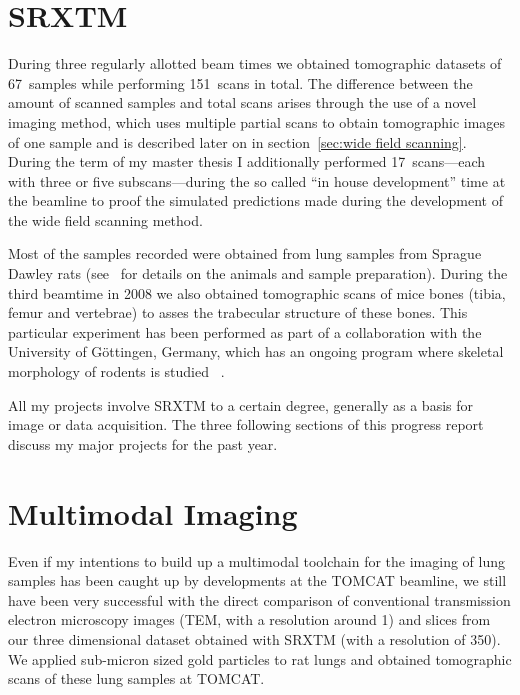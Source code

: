 \documentclass[]{scrartcl}
\begin{document}
\section{SRXTM}
During three regularly allotted beam times we obtained tomographic datasets of 67~samples while performing 151~scans in total. The difference between the amount of scanned samples and total scans arises through the use of a novel imaging method, which uses multiple partial scans to obtain tomographic images of one sample and is described later on in section~\ref{sec:wide field scanning}. During the term of my master thesis I additionally performed 17~scans---each with three or five subscans---during the so called ``in house development'' time at the beamline to proof the simulated predictions made during the development of the wide field scanning method.

Most of the samples recorded were obtained from lung samples from Sprague Dawley rats (see~\cite{Schittny2008} for details on the animals and sample preparation). During the third beamtime in 2008 we also obtained tomographic scans of mice bones (tibia, femur and vertebrae) to asses the trabecular structure of these bones. This particular experiment has been performed as part of a collaboration with the University of G\"ottingen, Germany, which has an ongoing program where skeletal morphology of rodents is studied~ \cite{Dullin2007,Missbach-Guentner2007}. 


All my projects involve SRXTM to a certain degree, generally as a basis for image or data acquisition. The three following sections of this progress report discuss my major projects for the past year.

\section{Multimodal Imaging}
\label{sec:multimodal imaging}
Even if my intentions to build up a multimodal toolchain for the imaging of lung samples has been caught up by developments at the TOMCAT beamline, we still have been very successful with the direct comparison of conventional transmission electron microscopy images (TEM, with a resolution around \unit{1}{\nano\meter}) and slices from our three dimensional dataset obtained with SRXTM (with a resolution of \unit{350}{\nano\meter}). We applied sub-micron sized gold particles to rat lungs and obtained tomographic scans of these lung samples at TOMCAT.
\end{document}
